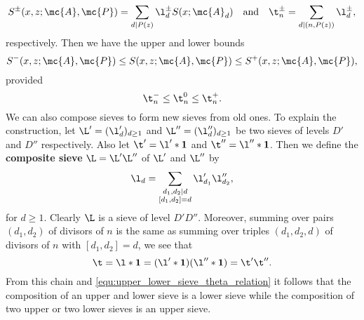     \[
      S^{\pm}(x,z;\mc{A},\mc{P}) = \sum_{d \mid P(z)}\l_{d}^{\pm}S(x;\mc{A}_{d}) \quad \text{and} \quad \t_{n}^{\pm} = \sum_{d \mid (n,P(z))}\l_{d}^{\pm},
    \]
    respectively. Then we have the upper and lower bounds
    \[
      S^{-}(x,z;\mc{A},\mc{P}) \le S(x,z;\mc{A},\mc{P}) \le S^{+}(x,z;\mc{A},\mc{P}),
    \]
    provided
    \begin{equation}\label{equ:upper_lower_sieve_theta_relation}
      \t_{n}^{-} \le \t_{n}^{0} \le \t_{n}^{+}.
    \end{equation}
    We can also compose sieves to form new sieves from old ones. To explain the construction, let $\L' = (\l'_{d})_{d \ge 1}$ and $\L'' = (\l''_{d})_{d \ge 1}$ be two sieves of levels $D'$ and $D''$ respectively. Also let $\t' = \l' \ast \mathbf{1}$ and $\t'' = \l'' \ast \mathbf{1}$. Then we define the \textbf{composite sieve} $\L = \L'\L''$ of $\L'$ and $\L''$ by
    \[
      \l_{d} = \sum_{\substack{ d_{1},d_{2} \mid d \\ [d_{1},d_{2}] = d}}\l'_{d_{1}}\l''_{d_{2}},
    \]
    for $d \ge 1$. Clearly $\L$ is a sieve of level $D'D''$. Moreover, summing over pairs $(d_{1},d_{2})$ of divisors of $n$ is the same as summing over triples $(d_{1},d_{2},d)$ of divisors of $n$ with $[d_{1},d_{2}] = d$, we see that
    \[
      \t = \l \ast \mathbf{1} = (\l' \ast \mathbf{1})(\l'' \ast \mathbf{1}) = \t'\t''.
    \]
    From this chain and \cref{equ:upper_lower_sieve_theta_relation} it follows that the composition of an upper and lower sieve is a lower sieve while the composition of two upper or two lower sieves is an upper sieve.

